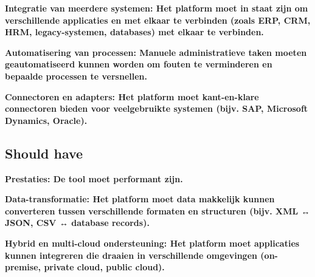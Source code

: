 \vspace{\baselineskip}

\textbf{Integratie van meerdere systemen: Het platform moet in staat zijn om verschillende applicaties en met elkaar te verbinden (zoals ERP, CRM, HRM, legacy-systemen, databases) met elkaar te verbinden.}

\vspace{\baselineskip}



\vspace{\baselineskip}

\textbf{Automatisering van processen: Manuele administratieve taken moeten geautomatiseerd kunnen worden om fouten te verminderen en bepaalde processen te versnellen.}

\vspace{\baselineskip}



\vspace{\baselineskip}

\textbf{Connectoren en adapters: Het platform moet kant-en-klare connectoren bieden voor veelgebruikte systemen (bijv. SAP, Microsoft Dynamics, Oracle).}

\vspace{\baselineskip}



\subsection{Should have}%
\label{ShouldHaveBoomi}

\textbf{Prestaties: De tool moet performant zijn.}

\vspace{\baselineskip}



\vspace{\baselineskip}

\textbf{Data-transformatie: Het platform moet data makkelijk kunnen converteren tussen verschillende formaten en structuren (bijv. XML ↔ JSON, CSV ↔ database records).}

\vspace{\baselineskip}



\vspace{\baselineskip}

\textbf{Hybrid en multi-cloud ondersteuning: Het platform moet applicaties kunnen integreren die draaien in verschillende omgevingen (on-premise, private cloud, public cloud).}

